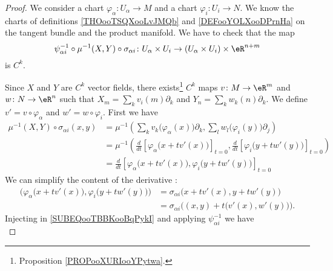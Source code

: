 \begin{proof}
	We consider a chart \(\varphi_{\alpha} \colon U_{\alpha}\to M  \) and a chart \(\varphi_i \colon U_i\to N  \). We know the charts of definitions \ref{THOooTSQXooLvJMQb} and \ref{DEFooYOLXooDPrnHa} on the tangent bundle and the product manifold. We have to check that the map
	\begin{equation}
		\psi_{\alpha i}^{-1}\circ\mu^{-1}(X,Y)\circ\sigma_{\alpha i} \colon U_{\alpha}\times U_i\to (U_{\alpha}\times U_i)\times \eR^{n+m}
	\end{equation}
	is \( C^k\).

	Since \( X\) and \( Y\) are \( C^k\) vector fields, there exists\footnote{Proposition \ref{PROPooXURIooYPytwa}.} \( C^k\) maps \(v \colon M\to \eR^m  \) and \(w \colon N\to \eR^n  \) such that \( X_m=\sum_kv_i(m)\partial_k\) and \( Y_n=\sum_kw_k(n)\partial_k\). We define \( v'=v\circ\varphi_{\alpha}\) and \( w'=w\circ\varphi_i\). First we have
	\begin{subequations}
		\begin{align}
			\mu^{-1}(X,Y)\circ\sigma_{\alpha i}(x,y) & =\mu^{-1}\left(   \sum_kv_k\big( \varphi_{\alpha}(x) \big)\partial_k,\sum_lw_l\big( \varphi_i(y) \big)\partial_j   \right)                                          \\
			                                         & =\mu^{-1}\left(   \frac{d}{dt} \left[ \varphi_{\alpha}\big( x+tv'(x) \big)  \right]_{t=0},\frac{d}{dt} \left[ \varphi_i\big( y+tw'(y) \big)  \right]_{t=0}  \right) \\
			                                         & =\frac{d}{dt} \left[ \varphi_{\alpha}\big( x+tv'(x) \big),\varphi_i\big( y+tw'(y) \big)  \right]_{t=0}	\label{SUBEQooTBBKooBqPykI}
		\end{align}
	\end{subequations}
	We can simplify the content of the derivative :
	\begin{subequations}
		\begin{align}
			\Big( \varphi_{\alpha}\big( x+tv'(x) \big),\varphi_i\big( y+tw'(y) \big) \Big) & =\sigma_{\alpha i}\Big( x+tv'(x),y+tw'(y) \Big)               \\
			                                                                               & =\sigma_{\alpha i}\Big( (x,y)+t\big( v'(x),w'(y) \big) \Big).
		\end{align}
	\end{subequations}
	Injecting in \eqref{SUBEQooTBBKooBqPykI} and applying \( \psi_{\alpha i}^{-1}\) we have
	\begin{subequations}

\end{subequations}
\end{proof}
